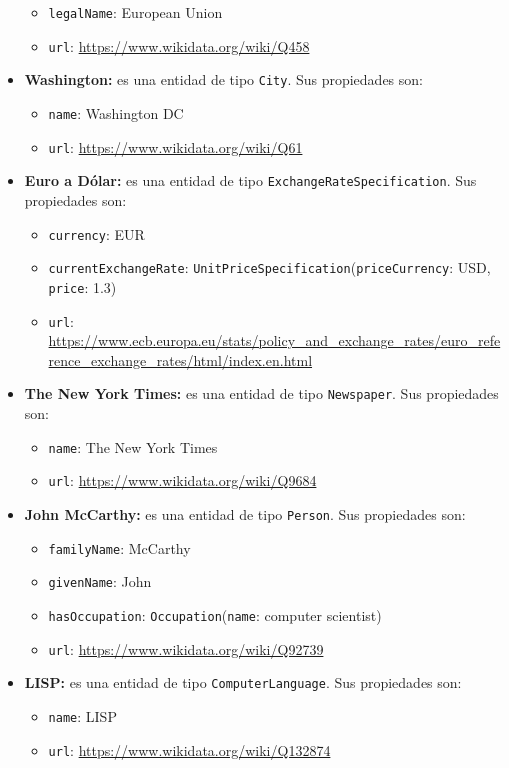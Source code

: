 \documentclass[11pt]{article}
\begin{document}
\begin{itemize}
\begin{itemize}
            \item \verb|legalName|: European Union
            \item \verb|url|: \url{https://www.wikidata.org/wiki/Q458}
        \end{itemize}
    \item \textbf{Washington:} es una entidad de tipo \verb|City|. Sus propiedades son:
        \begin{itemize}
            \item \verb|name|: Washington DC
            \item \verb|url|: \url{https://www.wikidata.org/wiki/Q61}
        \end{itemize}
    \item \textbf{Euro a Dólar:} es una entidad de tipo \verb|ExchangeRateSpecification|. Sus propiedades son:
        \begin{itemize}
            \item \verb|currency|: EUR
            \item \verb|currentExchangeRate|: \verb|UnitPriceSpecification|(\verb|priceCurrency|: USD, \verb|price|: 1.3)
            \item \verb|url|: \url{https://www.ecb.europa.eu/stats/policy_and_exchange_rates/euro_reference_exchange_rates/html/index.en.html}
        \end{itemize}
    \item \textbf{The New York Times:} es una entidad de tipo \verb|Newspaper|. Sus propiedades son:
        \begin{itemize}
            \item \verb|name|: The New York Times
            \item \verb|url|: \url{https://www.wikidata.org/wiki/Q9684}
        \end{itemize}
    \item \textbf{John McCarthy:} es una entidad de tipo \verb|Person|. Sus propiedades son:
        \begin{itemize}
            \item \verb|familyName|: McCarthy
            \item \verb|givenName|: John
            \item \verb|hasOccupation|: \verb|Occupation|(\verb|name|: computer scientist)
            \item \verb|url|: \url{https://www.wikidata.org/wiki/Q92739}
        \end{itemize}
    \item \textbf{LISP:} es una entidad de tipo \verb|ComputerLanguage|. Sus propiedades son:
        \begin{itemize}
            \item \verb|name|: LISP
            \item \verb|url|: \url{https://www.wikidata.org/wiki/Q132874}
        \end{itemize}
\end{itemize}
\end{document}
